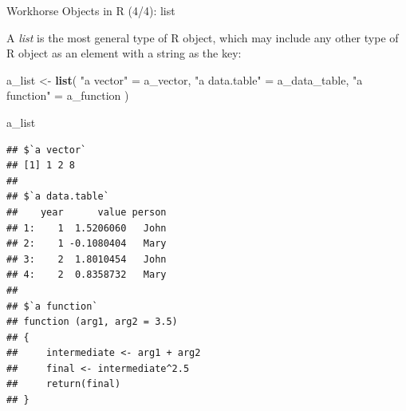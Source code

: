 \documentclass[10pt,ignorenonframetext,]{beamer}
\newenvironment{Shaded}{\begin{snugshade}}{\end{snugshade}}
\newcommand{\KeywordTok}[1]{\textcolor[rgb]{0.13,0.29,0.53}{\textbf{{#1}}}}
\newcommand{\StringTok}[1]{\textcolor[rgb]{0.31,0.60,0.02}{{#1}}}
\newcommand{\NormalTok}[1]{{#1}}
\begin{document}
\begin{frame}[fragile]{Workhorse Objects in R (4/4): list}

A \emph{list} is the most general type of R object, which may include
any other type of R object as an element with a string as the key:

\tiny

\begin{Shaded}
\begin{Highlighting}[]
\NormalTok{a_list <-}\StringTok{ }\KeywordTok{list}\NormalTok{(}
  \StringTok{"a vector"} \NormalTok{=}\StringTok{ }\NormalTok{a_vector,}
  \StringTok{"a data.table"} \NormalTok{=}\StringTok{ }\NormalTok{a_data_table,}
  \StringTok{"a function"} \NormalTok{=}\StringTok{ }\NormalTok{a_function}
\NormalTok{)}

\NormalTok{a_list}
\end{Highlighting}
\end{Shaded}

\begin{verbatim}
## $`a vector`
## [1] 1 2 8
## 
## $`a data.table`
##    year      value person
## 1:    1  1.5206060   John
## 2:    1 -0.1080404   Mary
## 3:    2  1.8010454   John
## 4:    2  0.8358732   Mary
## 
## $`a function`
## function (arg1, arg2 = 3.5) 
## {
##     intermediate <- arg1 + arg2
##     final <- intermediate^2.5
##     return(final)
## }
\end{verbatim}

\normalsize

\end{frame}
\end{document}
